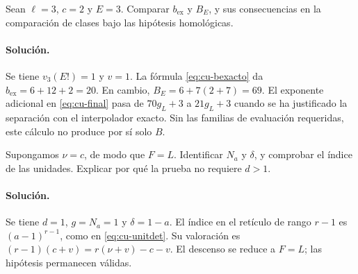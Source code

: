 \begin{ejercicio}
Sean $\ell=3$, $c=2$ y $E=3$. Comparar $b_{\mathrm{ex}}$ y $B_E$, y sus consecuencias en la comparación de clases bajo las hipótesis homológicas.
\end{ejercicio}
\paragraph{Solución.} Se tiene $v_3(E!)=1$ y $v=1$. La fórmula \eqref{eq:cu-bexacto} da $b_{\mathrm{ex}}=6+12+2=20$. En cambio, $B_E=6+7(2+7)=69$. El exponente adicional en \eqref{eq:cu-final} pasa de $70g_L+3$ a $21g_L+3$ cuando se ha justificado la separación con el interpolador exacto. Sin las familias de evaluación requeridas, este cálculo no produce por sí solo $B$.

\begin{ejercicio}
Supongamos $\nu=c$, de modo que $F=L$. Identificar $N_a$ y $\delta$, y comprobar el índice de las unidades. Explicar por qué la prueba no requiere $d>1$.
\end{ejercicio}
\paragraph{Solución.} Se tiene $d=1$, $g=N_a=1$ y $\delta=1-a$. El índice en el retículo de rango $r-1$ es $(a-1)^{r-1}$, como en \eqref{eq:cu-unitdet}. Su valoración es $(r-1)(c+v)=r(\nu+v)-c-v$. El descenso se reduce a $F=L$; las hipótesis permanecen válidas.
